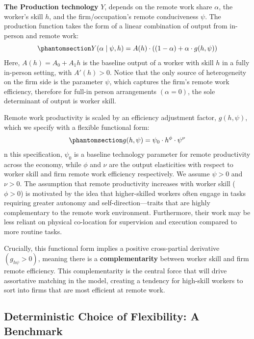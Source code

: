 \documentclass[
  11pt,
  letterpaper,
  DIV=11,
  numbers=noendperiod]{scrartcl}
\begin{document}
\textbf{The Production technology} \(Y\), depends on the remote work
share \(\alpha\), the worker's skill \(h\), and the firm/occupation's
remote conduciveness \(\psi\). The production function takes the form of
a linear combination of output from in-person and remote work:
\begin{equation}\phantomsection\label{eq-prod-fun}{Y(\alpha \mid \psi, h) = A(h) \cdot \left((1 - \alpha) + \alpha \cdot g(h, \psi)\right)}\end{equation}
Here, \(A(h)=A_0 + A_1 h\) is the baseline output of a worker with skill
\(h\) in a fully in-person setting, with \(A'(h) > 0\). Notice that the
only source of heterogeneity on the firm side is the parameter \(\psi\),
which captures the firm's remote work efficiency, therefore for full-in
person arrangements \((\alpha = 0)\), the sole determinant of output is
worker skill.

Remote work productivity is scaled by an efficiency adjustment factor,
\(g(h, \psi)\), which we specify with a flexible functional form:
\begin{equation}\phantomsection\label{eq-remote-prod}{g(h, \psi) = \psi_0 \cdot h^\phi \cdot \psi^\nu}\end{equation}
n this specification, \(\psi_0\)\hspace{0pt} is a baseline technology
parameter for remote productivity across the economy, while \(\phi\) and
\(\nu\) are the output elasticities with respect to worker skill and
firm remote work efficiency respectively. We assume \(\psi>0\) and
\(\nu>0\). The assumption that remote productivity increases with worker
skill (\(\phi>0\)) is motivated by the idea that higher-skilled workers
often engage in tasks requiring greater autonomy and
self-direction---traits that are highly complementary to the remote work
environment. Furthermore, their work may be less reliant on physical
co-location for supervision and execution compared to more routine
tasks.

Crucially, this functional form implies a positive cross-partial
derivative \((g_{h\psi}​>0)\), meaning there is a
\textbf{complementarity} between worker skill and firm remote
efficiency. This complementarity is the central force that will drive
assortative matching in the model, creating a tendency for high-skill
workers to sort into firms that are most efficient at remote work.

\subsection{Deterministic Choice of Flexibility: A
Benchmark}\label{deterministic-choice-of-flexibility-a-benchmark}
\end{document}
